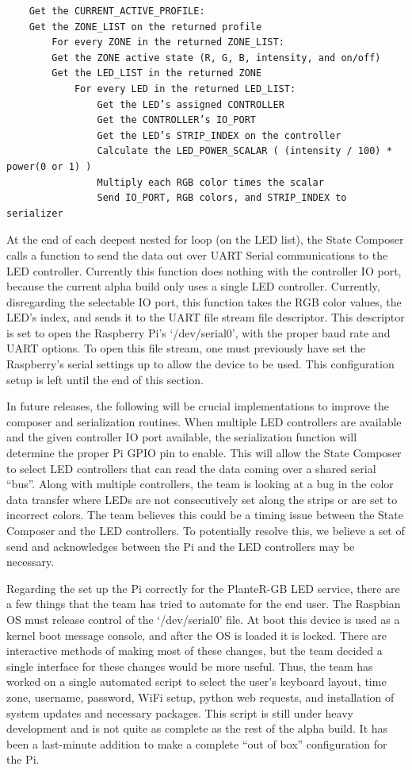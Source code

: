 \documentclass[onecolumn, draftclsnofoot,10pt, compsoc]{IEEEtran}
\begin{document}
	\begin{lstlisting}
	Get the CURRENT_ACTIVE_PROFILE:
	Get the ZONE_LIST on the returned profile
		For every ZONE in the returned ZONE_LIST:
		Get the ZONE active state (R, G, B, intensity, and on/off)
		Get the LED_LIST in the returned ZONE
			For every LED in the returned LED_LIST:
				Get the LED’s assigned CONTROLLER
				Get the CONTROLLER’s IO_PORT
				Get the LED’s STRIP_INDEX on the controller
				Calculate the LED_POWER_SCALAR ( (intensity / 100) * power(0 or 1) )
				Multiply each RGB color times the scalar
				Send IO_PORT, RGB colors, and STRIP_INDEX to serializer
	\end{lstlisting}

	\noindent At the end of each deepest nested for loop (on the LED list), the State Composer calls a function to send the data out over UART 
	Serial communications to the LED controller. Currently this function does nothing with the controller IO port, because the current alpha build 
	only uses a single LED controller. Currently, disregarding the selectable IO port, this function takes the RGB color values, the LED’s index, 
	and sends it to the UART file stream file descriptor. This descriptor is set to open the Raspberry Pi’s ‘/dev/serial0’, with the proper baud rate 
	and UART options. To open this file stream, one must previously have set the Raspberry’s serial settings up to allow the device to be used. This 
	configuration setup is left until the end of this section.  

	\noindent In future releases, the following will be crucial implementations to improve the composer and serialization routines. When multiple LED 
	controllers are available and the given controller IO port available, the serialization function will determine the proper Pi GPIO pin to enable. 
	This will allow the State Composer to select LED controllers that can read the data coming over a shared serial “bus”. Along with multiple 
	controllers, the team is looking at a bug in the color data transfer where LEDs are not consecutively set along the strips or are set to incorrect 
	colors. The team believes this could be a timing issue between the State Composer and the LED controllers. To potentially resolve this, we believe 
	a set of send and acknowledges between the Pi and the LED controllers may be necessary.

	\noindent Regarding the set up the Pi correctly for the PlanteR-GB LED service, there are a few things that the team has tried to automate for the 
	end user. The Raspbian OS must release control of the ‘/dev/serial0’ file. At boot this device is used as a kernel boot message console, and after 
	the OS is loaded it is locked. There are interactive methods of making most of these changes, but the team decided a single interface for these 
	changes would be more useful. Thus, the team has worked on a single automated script to select the user’s keyboard layout, time zone, username, 
	password, WiFi setup, python web requests, and installation of system updates and necessary packages. This script is still under heavy development 
	and is not quite as complete as the rest of the alpha build. It has been a last-minute addition to make a complete “out of box” configuration for the Pi.  
\end{document}
